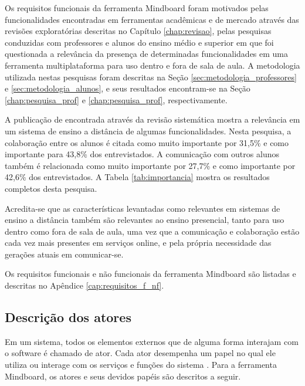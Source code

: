 Os requisitos funcionais da ferramenta Mindboard foram motivados pelas funcionalidades encontradas em ferramentas acadêmicas e de mercado através das revisões exploratórias descritas no Capítulo \ref{chap:revisao}, pelas pesquisas conduzidas com professores e alunos do ensino médio e superior em que foi questionada a relevância da presença de determinadas funcionalidades em uma ferramenta multiplataforma para uso dentro e fora de sala de aula. A metodologia utilizada nestas pesquisas foram descritas na Seção \ref{sec:metodologia_professores} e \ref{sec:metodologia_alunos}, e seus resultados encontram-se na Seção \ref{chap:pesquisa_prof} e \ref{chap:pesquisa_prof}, respectivamente. 


A publicação de   encontrada através da revisão sistemática mostra a relevância em um sistema de ensino a distância de algumas funcionalidades. Nesta pesquisa, a colaboração entre os alunos é citada como muito importante por 31,5\% e como importante para 43,8\% dos entrevistados. A comunicação com outros alunos também é relacionada como muito importante por 27,7\% e como importante por 42,6\% dos entrevistados. A Tabela \ref{tab:importancia} mostra os resultados completos desta pesquisa. 

Acredita-se que as características levantadas como relevantes em sistemas de ensino a distância também são relevantes ao ensino presencial, tanto para uso dentro como fora de sala de aula, uma vez que a comunicação e colaboração estão cada vez mais presentes em serviços online, e pela própria necessidade das gerações atuais em comunicar-se.

Os requisitos funcionais e não funcionais da ferramenta Mindboard são listadas e descritas no Apêndice \ref{cap:requisitos_f_nf}.


\subsection{Descrição dos atores}

Em um sistema, todos os elementos externos que de alguma forma interajam com o software é chamado de ator. Cada ator desempenha um papel no qual ele utiliza ou interage com os serviços e funções do sistema \cite{guedes:2009}. Para a ferramenta Mindboard, os atores e seus devidos papéis são descritos a seguir.


